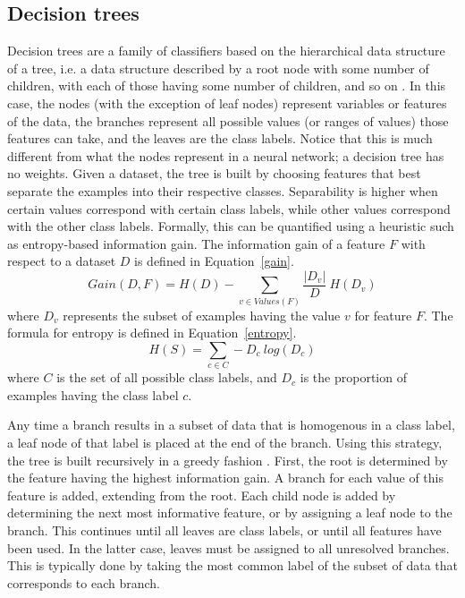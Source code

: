 \subsection{Decision trees}
Decision trees are a family of classifiers based on the hierarchical data structure of a tree, i.e. a data structure described by a root node with some number of children, with each of those having some number of children, and so on \cite{quinlan1986}.  In this case, the nodes (with the exception of leaf nodes) represent variables or features of the data, the branches represent all possible values (or ranges of values) those features can take, and the leaves are the class labels.  Notice that this is much different from what the nodes represent in a neural network; a decision tree has no weights.  Given a dataset, the tree is built by choosing features that best separate the examples into their respective classes.  Separability is higher when certain values correspond with certain class labels, while other values correspond with the other class labels.  Formally, this can be quantified using a heuristic such as entropy-based information gain.  The information gain of a feature $F$ with respect to a dataset $D$ is defined in Equation~\ref{gain}.
%
\begin{equation}
Gain(D, F) = H(D) - \sum_{v \in Values(F)} \frac{|D_v|}{D}\ H(D_v)
\label{gain}
\end{equation}
%
where $D_v$ represents the subset of examples having the value $v$ for feature $F$.  The formula for entropy is defined in Equation~\ref{entropy}.
%
\begin{equation}
H(S) = \sum_{c \in C} -D_c\ log (D_c)
\label{entropy}
\end{equation}
%
where $C$ is the set of all possible class labels, and $D_c$ is the proportion of examples having the class label $c$.

Any time a branch results in a subset of data that is homogenous in a class label, a leaf node of that label is placed at the end of the branch.  Using this strategy, the tree is built recursively in a greedy fashion \cite{hssina2014}.  First, the root is determined by the feature having the highest information gain.  A branch for each value of this feature is added, extending from the root.  Each child node is added by determining the next most informative feature, or by assigning a leaf node to the branch.  This continues until all leaves are class labels, or until all features have been used.  In the latter case, leaves must be assigned to all unresolved branches.  This is typically done by taking the most common label of the subset of data that corresponds to each branch.

